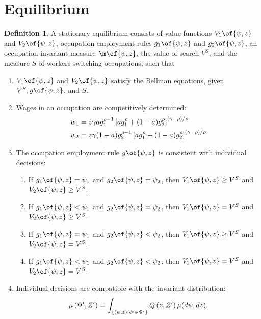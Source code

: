 \documentclass[12pt]{article}
\theoremstyle{definition}
\newtheorem{definition}{Definition}
\begin{document}
\section{Equilibrium}
\begin{definition}
	\label{def:equilibrium}
	A stationary equilibrium consists of value functions $V_1\of{\psi, z}$ and $V_2\of{\psi, z}$, occupation employment rules $g_1\of{\psi,z}$ and $g_2\of{\psi, z}$, an occupation-invariant measure $\m\of{\psi, z}$, the value of search $V^S$, and the measure $S$ of workers switching occupations, such that
	\begin{enumerate}
		\item $V_1\of{\psi, z}$ and $V_2\of{\psi, z}$ satisfy the Bellman equations, given $V^S, g\of{\psi, z}$, and $S$.
		\item Wages in an occupation are competitively determined:
		\begin{equation}
			\notag
			\begin{aligned}
				& w_1=z \gamma a g_1^{\rho-1}\left[a g_1^\rho+(1-a) g_2^\rho\right]^{(\gamma-\rho) / \rho} \\
				& w_2=z \gamma(1-a) g_2^{\rho-1}\left[a g_1^\rho+(1-a) g_2^\rho\right]^{(\gamma-\rho) / \rho}
			\end{aligned}
		\end{equation}
		\item The occupation employment rule $g\of{\psi, z}$ is consistent with individual decisions:
		\begin{enumerate}
			\item If $g_1\of{\psi, z} = \psi_1$ and $g_2\of{\psi, z} = \psi_2$, then $V_1\of{\psi,z}\geq V^S$ and $V_2\of{\psi, z} \geq V^S$.
			\item If $g_1\of{\psi, z} < \psi_1$ and $g_2\of{\psi, z} = \psi_2$, then $V_1\of{\psi,z}= V^S$ and $V_2\of{\psi, z} \geq V^S$.
			\item If $g_1\of{\psi, z} = \psi_1$ and $g_2\of{\psi, z} < \psi_2$, then $V_1\of{\psi,z}\geq V^S$ and $V_2\of{\psi, z} = V^S$.
			\item If $g_1\of{\psi, z} < \psi_1$ and $g_2\of{\psi, z} < \psi_2$, then $V_1\of{\psi,z}= V^S$ and $V_2\of{\psi, z} = V^S$.
		\end{enumerate}
		\item Individual decisions are compatible with the invariant distribution:
		\begin{equation}
			\notag
			\mu\left(\Psi^{\prime}, Z^{\prime}\right)=\int_{\left\{(\psi, z): \psi^{\prime} \in \Psi^{\prime}\right\}} Q\left(z, Z^{\prime}\right) \mu(d \psi, d z) .

\end{equation}
\end{enumerate}
\end{definition}
\end{document}
